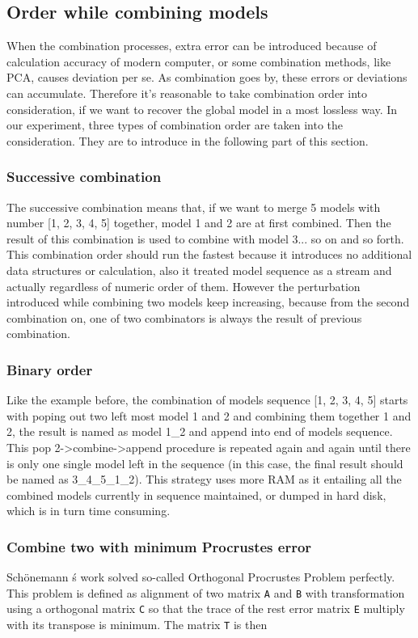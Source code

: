 \subsection{Order while combining models}
When the combination processes, extra error can be introduced because of calculation accuracy of modern computer, or some combination methods, like PCA, causes deviation per se. As combination goes by, these errors or deviations can accumulate. Therefore it's reasonable to take combination order into consideration, if we want to recover the global model in a most lossless way. In our experiment, three types of combination order are taken into the consideration. They are to introduce in the following part of this section.
	
	\subsubsection{Successive combination}
	The successive combination means that, if we want to merge 5 models with number [1, 2, 3, 4, 5] together, model 1 and 2 are at first combined. Then the result of this combination is used to combine with model 3... so on and so forth. This combination order should run the fastest because it introduces no additional data structures or calculation, also it treated model sequence as a stream and actually regardless of numeric order of them. However the perturbation introduced while combining two models keep increasing, because from the second combination on, one of two combinators is always the result of previous combination.

	\subsubsection{Binary order}
	Like the example before, the combination of models sequence [1, 2, 3, 4, 5] starts with poping out two left most model 1 and 2 and combining them together 1 and 2, the result is named as model 1_2 and append into end of models sequence. This pop 2->combine->append procedure is repeated again and again until there is only one single model left in the sequence (in this case, the final result should be named as 3_4_5_1_2). This strategy uses more RAM as it entailing all the combined models currently in sequence maintained, or dumped in hard disk, which is in turn time consuming.

	\subsubsection{Combine two with minimum Procrustes error}
	Sch{\"o}nemann \'s work solved so-called Orthogonal Procrustes Problem perfectly. This problem is defined as alignment of two matrix \verb|A| and \verb|B| with transformation using a orthogonal matrix \verb|C| so that the trace of the rest error matrix \verb|E| multiply with its transpose is minimum. The matrix \verb|T| is then


